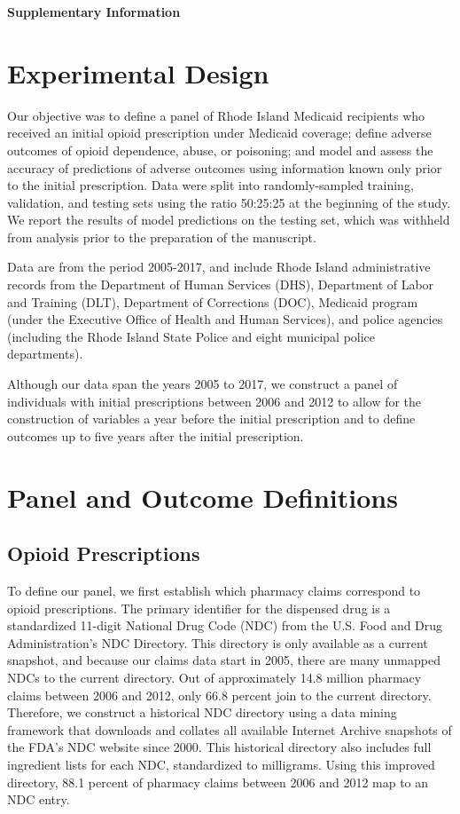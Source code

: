 \documentclass[10pt, letter]{article}
\begin{document}
{\huge \bf Supplementary Information}

\linenumbers

\section{Experimental Design}

Our objective was to define a panel of Rhode Island Medicaid recipients who received an initial opioid prescription under Medicaid coverage; define adverse outcomes of opioid dependence, abuse, or poisoning; and model and assess the accuracy of predictions of adverse outcomes using information known only prior to the initial prescription. Data were split into randomly-sampled training, validation, and testing sets using the ratio 50:25:25 at the beginning of the study. We report the results of model predictions on the testing set, which was withheld from analysis prior to the preparation of the manuscript.

Data are from the period 2005-2017, and include Rhode Island administrative records from the Department of Human Services (DHS), Department of Labor and Training (DLT), Department of Corrections (DOC), Medicaid program (under the Executive Office of Health and Human Services), and police agencies (including the Rhode Island State Police and eight municipal police departments).

Although our data span the years 2005 to 2017, we construct a panel of individuals with initial prescriptions between 2006 and 2012 to allow for the construction of variables a year before the initial prescription and to define outcomes up to five years after the initial prescription.

\section{Panel and Outcome Definitions}

\subsection{Opioid Prescriptions}

To define our panel, we first establish which pharmacy claims correspond to opioid prescriptions. The primary identifier for the dispensed drug is a standardized 11-digit National Drug Code (NDC) from the U.S. Food and Drug Administration's NDC Directory. This directory is only available as a current snapshot, and because our claims data start in 2005, there are many unmapped NDCs to the current directory. Out of approximately 14.8 million pharmacy claims between 2006 and 2012, only 66.8 percent join to the current directory. Therefore, we construct a historical NDC directory using a data mining framework that downloads and collates all available Internet Archive snapshots of the FDA's NDC website since 2000. This historical directory also includes full ingredient lists for each NDC, standardized to milligrams. Using this improved directory, 88.1 percent of pharmacy claims between 2006 and 2012 map to an NDC entry. 
\end{document}
